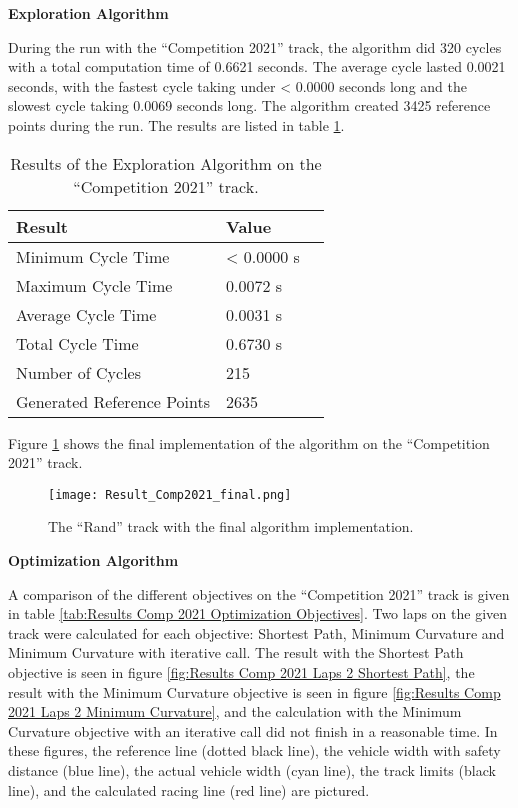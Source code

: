 \textbf{Exploration Algorithm}

During the run with the ``Competition 2021'' track, the algorithm did 320 cycles with a total computation time of 0.6621 seconds. The average cycle lasted 0.0021 seconds, with the fastest cycle taking under < 0.0000 seconds long and the slowest cycle taking 0.0069 seconds long. The algorithm created 3425 reference points during the run. The results are listed in table \ref{tab:Results Comp 2021 Exploration}.

\begin{table}[H]
    \centering
    \begin{tabular}{|l|l|l|}
        \hline
        \textbf{Result}            & \textbf{Value} \\ \hline
        Minimum Cycle Time         & < 0.0000 s     \\ \hline
        Maximum Cycle Time         & 0.0072 s       \\ \hline
        Average Cycle  Time        & 0.0031 s       \\ \hline
        Total Cycle Time           & 0.6730 s       \\ \hline
        Number of Cycles           & 215            \\ \hline
        Generated Reference Points & 2635           \\ \hline
    \end{tabular}
    \caption{Results of the Exploration Algorithm on the ``Competition 2021'' track.}
    \label{tab:Results Comp 2021 Exploration}
\end{table}

Figure \ref{fig:Result Comp 2021 Final} shows the final implementation of the algorithm on the ``Competition 2021'' track.
\begin{figure}[H]
    \centering
    \texttt{[image: Result\_Comp2021\_final.png]}
    \caption{The ``Rand'' track with the final algorithm implementation.}
    \label{fig:Result Comp 2021 Final}
\end{figure}

\textbf{Optimization Algorithm}

A comparison of the different objectives on the ``Competition 2021'' track is given in table \ref{tab:Results Comp 2021 Optimization Objectives}. Two laps on the given track were calculated for each objective: Shortest Path, Minimum Curvature and Minimum Curvature with iterative call. The result with the Shortest Path objective is seen in figure \ref{fig:Results Comp 2021 Laps 2 Shortest Path}, the result with the Minimum Curvature objective is seen in figure \ref{fig:Results Comp 2021 Laps 2 Minimum Curvature}, and the calculation with the Minimum Curvature objective with an iterative call did not finish in a reasonable time. In these figures, the reference line (dotted black line), the vehicle width with safety distance (blue line), the actual vehicle width (cyan line), the track limits (black line), and the calculated racing line (red line) are pictured.

